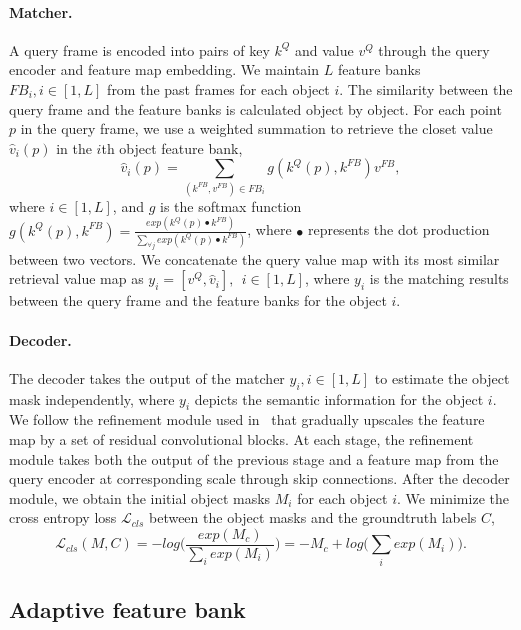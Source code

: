 \documentclass{article}
\begin{document}
\paragraph{Matcher.}
A query frame is encoded into pairs of key $k^Q$ and value $v^Q$ through the query encoder and  feature map embedding.
We maintain $L$ feature banks $FB_i, i\in [1,L]$ from the past frames for each object $i$.
The similarity between the query frame and the feature banks is calculated object by object.
For each point $p$ in the query frame, we use a weighted summation to retrieve the closet value $\hat{v}_i(p)$ in the $i$th object feature bank, 
\begin{equation}
    \hat{v}_i(p) = \sum_{(k^{FB}, v^{FB})\in FB_i} g(k^Q(p), k^{FB}) v^{FB},
    \label{eqn:matcher}
\end{equation}
where $i \in [1, L]$, and $g$ is the softmax function $g(k^Q(p), k^{FB}) = \frac{exp(k^Q(p) \bullet k^{FB})}{\sum_{\forall j} exp(k^Q(p) \bullet k^{FB})}$, where $\bullet$ represents the dot production between two vectors.
We concatenate the query value map with its most similar retrieval value map as $y_i = [v^Q, \hat{v}_i],~~i \in [1, L]$, where $y_i$ is the matching results between the query frame and the feature banks for the object $i$.

\paragraph{Decoder.}
The decoder takes the output of the matcher $y_i, i\in [1, L]$ to estimate the object mask independently, where $y_i$ depicts the semantic information for the object $i$.
We follow the refinement module used in~\cite{oh_fast_2018, lin_agss-vos_2019, oh_video_2019} that gradually upscales the feature map by a set of residual convolutional blocks.
At each stage, the refinement module takes both the output of the previous stage and a feature map from the query encoder at corresponding scale through skip connections.
After the decoder module, we obtain the initial object masks $M_i$ for each object $i$.
We minimize the cross entropy loss $\mathcal{L}_{cls}$ between the object masks and the groundtruth labels $C$,
\begin{equation}
    \mathcal{L}_{cls}(M, C) = -log\big(\frac{exp(M_c)}{\sum_i exp(M_i)} \big) = -M_c + log\big(\sum_i exp(M_i) \big).
    \label{eqn:crossentropy}
\end{equation}

\subsection{Adaptive feature bank}
\label{sec:featurebank}
\end{document}
